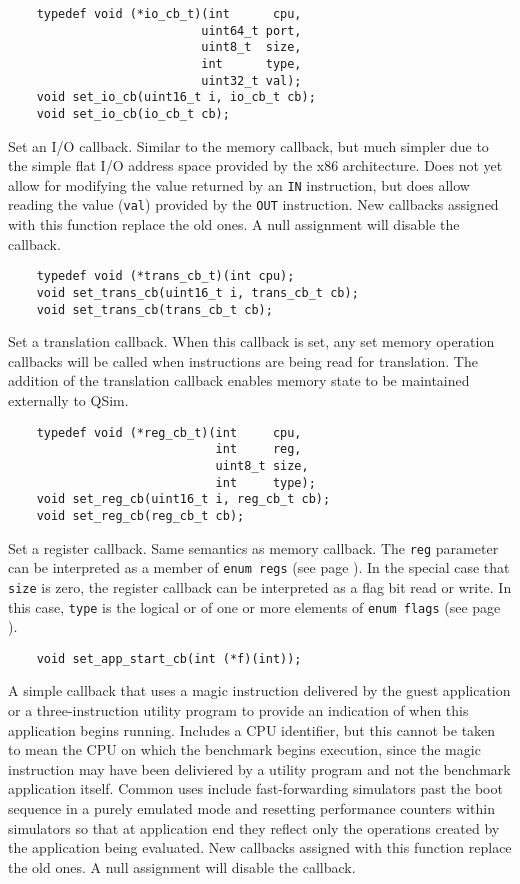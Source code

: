\documentclass[letterpaper, 10pt]{book}
\begin{document}
\label{func:set_io_cb} \begin{verbatim}
    typedef void (*io_cb_t)(int      cpu, 
                           uint64_t port, 
                           uint8_t  size, 
                           int      type, 
                           uint32_t val);
    void set_io_cb(uint16_t i, io_cb_t cb);
    void set_io_cb(io_cb_t cb);
\end{verbatim}
Set an I/O callback. Similar to the memory callback, but much simpler due to
the simple flat I/O address space provided by the x86 architecture. Does not
yet allow for modifying the value returned by an \texttt{IN} instruction, but
does allow reading the value (\texttt{val}) provided by the \texttt{OUT}
instruction. New callbacks assigned with this function replace the old ones. A
null assignment will disable the callback.

\label{func:set_trans_cb} \begin{verbatim}
    typedef void (*trans_cb_t)(int cpu);
    void set_trans_cb(uint16_t i, trans_cb_t cb);
    void set_trans_cb(trans_cb_t cb);
\end{verbatim}
Set a translation callback. When this callback is set, any set memory operation
callbacks will be called when instructions are being read for translation. The
addition of the translation callback enables memory state to be maintained
externally to QSim.

\label{func:set_reg_cb} \begin{verbatim}
    typedef void (*reg_cb_t)(int     cpu,
                             int     reg,
                             uint8_t size,
                             int     type);
    void set_reg_cb(uint16_t i, reg_cb_t cb);
    void set_reg_cb(reg_cb_t cb);
\end{verbatim}
Set a register callback. Same semantics as memory callback. The \texttt{reg}
parameter can be interpreted as a member of \texttt{enum regs} (see page 
\pageref{enum:regs}). In the special case that \texttt{size} is zero, the
register callback can be interpreted as a flag bit read or write. In this case,
\texttt{type} is the logical or of one or more elements of \texttt{enum flags}
(see page \pageref{enum flags}).

\label{func:set_app_start_cb} \begin{verbatim}
    void set_app_start_cb(int (*f)(int));
\end{verbatim}
A simple callback that uses a magic instruction delivered by the guest 
application or a three-instruction utility program to provide an indication of
when this application begins running. Includes a CPU identifier, but
this cannot be taken to mean the CPU on which the benchmark begins execution,
since the magic instruction may have been deliviered by a utility program and
not the benchmark application itself. Common uses include fast-forwarding 
simulators past the boot sequence in a purely emulated mode and resetting
performance counters within simulators so that at application end they reflect
only the operations created by the application being evaluated. New callbacks
assigned with this function replace the old ones. A null assignment will
disable the callback.
\end{document}
